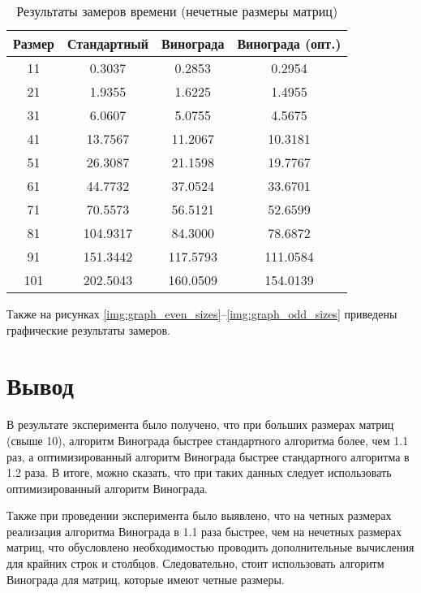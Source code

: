 \begin{table}[h]
    \begin{center}
        \begin{threeparttable}
        \captionsetup{justification=raggedright,singlelinecheck=off}
        \caption{Результаты замеров времени (нечетные размеры матриц)}
        \label{tbl:time_mes_odd}
        \begin{tabular}{|c|c|c|c|}
            \hline
            Размер & Стандартный & Винограда & Винограда (опт.) \\
            \hline
            11 & 0.3037 & 0.2853 & 0.2954 \\
            \hline
            21 & 1.9355 & 1.6225 & 1.4955 \\
            \hline
            31 & 6.0607 & 5.0755 & 4.5675 \\
            \hline
            41 & 13.7567 & 11.2067 & 10.3181 \\
            \hline
            51 & 26.3087 & 21.1598 & 19.7767 \\
            \hline
            61 & 44.7732 & 37.0524 & 33.6701 \\
            \hline
            71 & 70.5573 & 56.5121 & 52.6599 \\
            \hline
            81 & 104.9317 & 84.3000 & 78.6872 \\
            \hline
            91 & 151.3442 & 117.5793 & 111.0584 \\
            \hline
            101 & 202.5043 & 160.0509 & 154.0139 \\
            \hline
		\end{tabular}
    \end{threeparttable}
\end{center}
\end{table}

Также на рисунках \ref{img:graph_even_sizes}--\ref{img:graph_odd_sizes} приведены графические результаты замеров.

\clearpage


\section{Вывод}

В результате эксперимента было получено, что при больших размерах матриц (свыше 10), алгоритм Винограда быстрее стандартного алгоритма более, чем 1.1 раз, а оптимизированный алгоритм Винограда быстрее стандартного алгоритма в 1.2 раза. В итоге, можно сказать, что при таких данных следует использовать оптимизированный алгоритм Винограда.

Также при проведении эксперимента было выявлено, что на четных размерах реализация алгоритма Винограда в 1.1 раза быстрее, чем на нечетных размерах матриц, что обусловлено необходимостью проводить дополнительные вычисления для крайних строк и столбцов.  Следовательно, стоит использовать алгоритм Винограда для матриц, которые имеют четные размеры.
